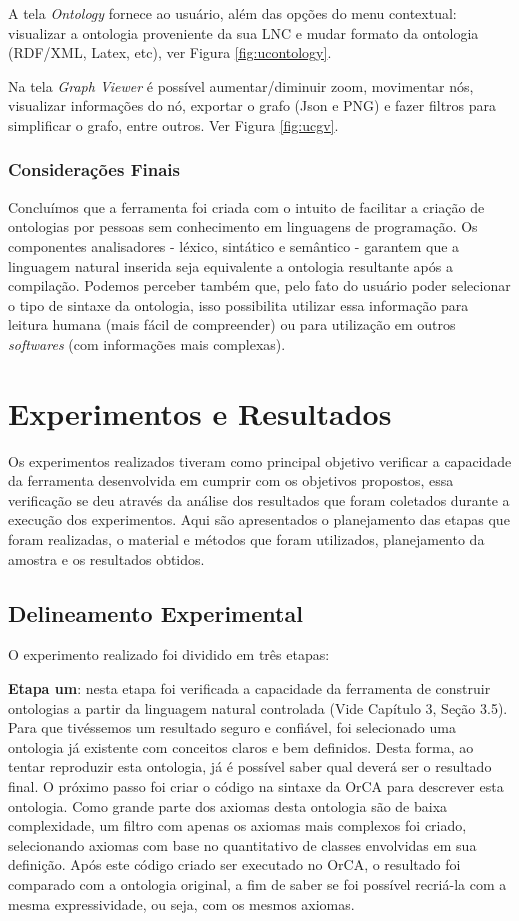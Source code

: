\documentclass{bcc}
\begin{document}
A tela \textit{Ontology} fornece ao usuário, além das opções do menu contextual: visualizar a ontologia proveniente da sua LNC e mudar formato da ontologia (RDF/XML, Latex, etc), ver Figura \ref{fig:ucontology}.

Na tela \textit{Graph Viewer} é possível aumentar/diminuir zoom, movimentar nós, visualizar informações do nó, exportar o grafo (Json e PNG) e fazer filtros para simplificar o grafo, entre outros. Ver Figura \ref{fig:ucgv}.


\subsection{Considerações Finais}
Concluímos que a ferramenta foi criada com o intuito de facilitar a criação de ontologias por pessoas sem conhecimento em linguagens de programação. Os componentes analisadores - léxico, sintático e semântico - garantem que a linguagem natural inserida seja equivalente a ontologia resultante após a compilação. Podemos perceber também que, pelo fato do usuário poder selecionar o tipo de sintaxe da ontologia, isso possibilita utilizar essa informação para leitura humana (mais fácil de compreender) ou para utilização em outros \textit{softwares} (com informações mais complexas).


\chapter{Experimentos e Resultados}
\label{chap:exp}

Os experimentos realizados tiveram como principal objetivo verificar a capacidade da ferramenta desenvolvida em cumprir com os objetivos propostos, essa verificação se deu através da análise dos resultados que foram coletados durante a execução dos experimentos. Aqui são apresentados o planejamento das etapas que foram realizadas, o material e métodos que foram utilizados, planejamento da amostra e os resultados obtidos.


\section{Delineamento Experimental}
O experimento realizado foi dividido em três etapas: 

\textbf{Etapa um}: nesta etapa foi verificada a capacidade da ferramenta de construir ontologias a partir da linguagem natural controlada (Vide Capítulo 3, Seção 3.5). Para que tivéssemos um resultado seguro e confiável, foi selecionado uma ontologia já existente com conceitos claros e bem definidos. Desta forma, ao tentar reproduzir esta ontologia, já é possível saber qual deverá ser o resultado final. O próximo passo foi criar o código na sintaxe da OrCA para descrever esta ontologia. Como grande parte dos axiomas desta ontologia são de baixa complexidade, um filtro com apenas os axiomas mais complexos foi criado, selecionando axiomas com base no quantitativo de classes envolvidas em sua definição. Após este código criado ser executado no OrCA, o resultado foi comparado com a ontologia original, a fim de saber se foi possível recriá-la com a mesma expressividade, ou seja, com os mesmos axiomas.
\end{document}
